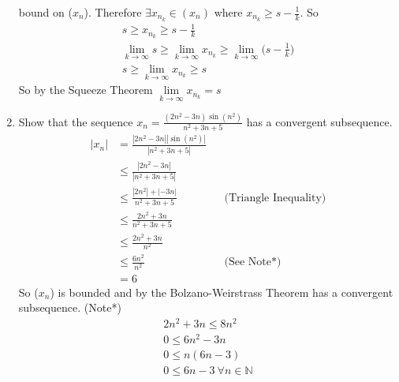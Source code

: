 \documentclass[12pt]{article}
\begin{document}
\begin{enumerate}
	bound on ($x_n$). Therefore $\exists x_{n_k} \in (x_n)$ where $x_{n_k} \geq s-\frac{1}{k}$. So 
	\begin{gather*}
		s \geq x_{n_k} \geq s-\frac{1}{k} \\
		\lim_{k \to \infty} s \geq \lim_{k \to \infty} x_{n_k} \geq \lim_{k \to \infty}\bigg(s-\frac{1}{k}\bigg) \\
		s \geq \lim_{k \rightarrow \infty} x_{n_k} \geq s
	\end{gather*}
	So by the Squeeze Theorem $\lim\limits_{k \to \infty} x_{n_k} = s$
	\item Show that the sequence $x_n = \frac{{(2n^2-3n)}\sin{(n^2)}}{n^2+3n+5}$ has a convergent subsequence.
		  \begin{align*}
			  |x_n| &= \frac{|2n^2-3n||\sin{(n^2)}|}{|n^2+3n+5|} \\
			  & \leq \frac{|2n^2-3n|}{|n^2+3n+5|} \\
			  & \leq \frac{|2n^2| + |-3n|}{n^2+3n+5} && \text{(Triangle Inequality)} \\
			  & \leq \frac{2n^2+3n}{n^2+3n+5} \\
			  & \leq \frac{2n^2+3n}{n^2} \\
			  & \leq \frac{6n^2}{n^2} && \text{(See Note*)} \\
			  &= 6
		  \end{align*}
		  So ($x_n$) is bounded and by the Bolzano-Weirstrass Theorem has a convergent subsequence.
		  (Note*)
		  \begin{gather*}
			  2n^2+3n \leq 8n^2 \\
			  0 \leq 6n^2-3n \\
			  0 \leq n(6n-3) \\
			  0 \leq 6n-3 \ \forall n \in \mathbb{N}
		  \end{gather*}
\end{enumerate}
\end{document}
